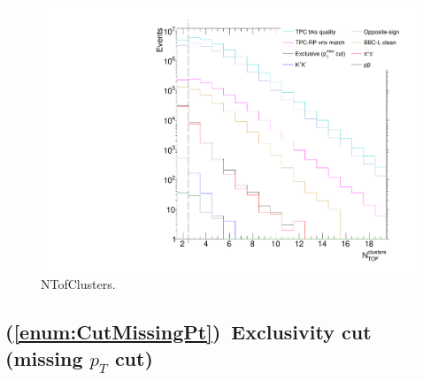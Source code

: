 \begin{figure}[ht!]
\centering%
\includegraphics[width=0.475\linewidth,page=1]{graphics/eventSelection/NTofClusters.pdf}%
\caption{NTofClusters.}\label{fig:NTofClusters}%
\end{figure}

\subsection{(\ref{enum:CutMissingPt})~Exclusivity cut (missing \texorpdfstring{$p_{T}$}{pT} cut)}


